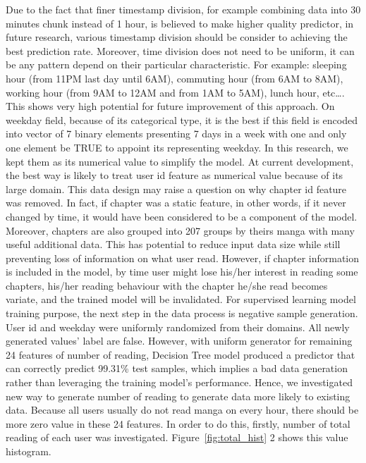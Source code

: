 \documentclass[English]{dicomopapers}
\begin{document}
Due to the fact that finer timestamp division, for example combining data into 30 minutes chunk instead of 1 hour, is believed to make higher quality predictor, in future research, various timestamp division should be consider to achieving the best prediction rate. Moreover, time division does not need to be uniform, it can be any pattern depend on their particular characteristic. For example: sleeping hour (from 11PM last day until 6AM), commuting hour (from 6AM to 8AM), working hour (from 9AM to 12AM and from 1AM to 5AM), lunch hour, etc\ldots. This shows very high potential for future improvement of this approach.\newline
On weekday field, because of its categorical type, it is the best if this field is encoded into vector of 7 binary elements presenting 7 days in a week with one and only one element be TRUE to appoint its representing weekday. In this research, we kept them as its numerical value to simplify the model.\newline
At current development, the best way is likely to treat user id feature as numerical value because of its large domain.\newline
This data design may raise a question on why chapter id feature was removed. In fact, if chapter was a static feature, in other words, if it never changed by time, it would have been considered to be a component of the model. Moreover, chapters are also grouped into 207 groups by theirs manga with many useful additional data. This has potential to reduce input data size while still preventing loss of information on what user read. However, if chapter information is included in the model, by time user might lose his/her interest in reading some chapters, his/her reading behaviour with the chapter he/she read becomes variate, and the trained model will be invalidated.\newline
For supervised learning model training purpose, the next step in the data process is negative sample generation. User id and weekday were uniformly randomized from their domains. All newly generated values' label are false. However, with uniform generator for remaining 24 features of number of reading, Decision Tree model produced a predictor that can correctly predict 99.31\% test samples, which implies a bad data generation rather than leveraging the training model's performance. Hence, we investigated new way to generate number of reading to generate data more likely to existing data. Because all users usually do not read manga on every hour, there should be more zero value in these 24 features. In order to do this, firstly, number of total reading of each user was investigated. Figure~\ref{fig:total_hist} 2 shows this value histogram.\newline
\end{document}
